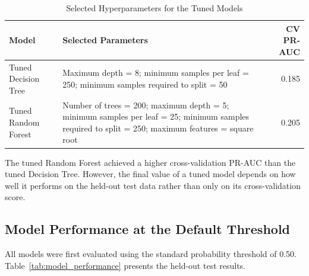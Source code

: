 \documentclass[12pt]{article}
\begin{document}
\begin{table}[H]
\centering
\caption{Selected Hyperparameters for the Tuned Models}
\label{tab:tuning_results}
\small
\begin{tabular}{p{3.4cm}p{8.5cm}r}
\hline
\textbf{Model} &
\textbf{Selected Parameters} &
\textbf{CV PR-AUC} \\
\hline
Tuned Decision Tree &
Maximum depth = 8; minimum samples per leaf = 250;
minimum samples required to split = 50 &
0.185 \\
\hline
Tuned Random Forest &
Number of trees = 200; maximum depth = 5;
minimum samples per leaf = 25; minimum samples required
to split = 250; maximum features = square root &
0.205 \\
\hline
\end{tabular}
\end{table}

The tuned Random Forest achieved a higher cross-validation PR-AUC than the tuned Decision Tree. However, the final value of a tuned model depends on how well it performs on the held-out test data rather than only on its cross-validation score.

\subsection{Model Performance at the Default Threshold}

All models were first evaluated using the standard probability threshold of 0.50. Table~\ref{tab:model_performance} presents the held-out test results.

\begin{table}[H]
\centering
\caption{Model Performance on the Held-Out Test Set at the Default Threshold}
\label{tab:model_performance}
\scriptsize
{}
\end{table}
\end{document}
